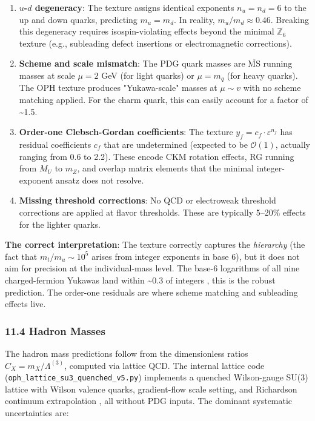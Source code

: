 \begin{enumerate}
\def\labelenumi{\arabic{enumi}.}
\item
  \textbf{\(u\)-\(d\) degeneracy}: The texture assigns identical exponents \(n_u = n_d = 6\) to the up and down quarks, predicting \(m_u = m_d\). In reality, \(m_u/m_d \approx 0.46\). Breaking this degeneracy requires isospin-violating effects beyond the minimal \(\mathbb{Z}_6\) texture (e.g., subleading defect insertions or electromagnetic corrections).
\item
  \textbf{Scheme and scale mismatch}: The PDG quark masses are \(\overline{\text{MS}}\) running masses at scale \(\mu = 2\) GeV (for light quarks) or \(\mu = m_q\) (for heavy quarks). The OPH texture produces "Yukawa-scale" masses at \(\mu \sim v\) with no scheme matching applied. For the charm quark, this can easily account for a factor of \textasciitilde1.5.
\item
  \textbf{Order-one Clebsch-Gordan coefficients}: The texture \(y_f = c_f \cdot \varepsilon^{n_f}\) has residual coefficients \(c_f\) that are undetermined (expected to be \(\mathcal{O}(1)\), actually ranging from 0.6 to 2.2). These encode CKM rotation effects, RG running from \(M_U\) to \(m_Z\), and overlap matrix elements that the minimal integer-exponent ansatz does not resolve.
\item
  \textbf{Missing threshold corrections}: No QCD or electroweak threshold corrections are applied at flavor thresholds. These are typically 5--20\% effects for the lighter quarks.
\end{enumerate}

\textbf{The correct interpretation}: The texture correctly captures the \emph{hierarchy} (the fact that \(m_t/m_u \sim 10^5\) arises from integer exponents in base 6), but it does not aim for precision at the individual-mass level. The base-6 logarithms of all nine charged-fermion Yukawas land within \textasciitilde0.3 of integers , this is the robust prediction. The order-one residuals are where scheme matching and subleading effects live.

\subsubsection{11.4 Hadron Masses}\label{114-hadron-masses}

The hadron mass predictions follow from the dimensionless ratios \(C_X = m_X/\Lambda^{(3)}\), computed via lattice QCD. The internal lattice code (\texttt{oph\_lattice\_su3\_quenched\_v5.py}) implements a quenched Wilson-gauge SU(3) lattice with Wilson valence quarks, gradient-flow scale setting, and Richardson continuum extrapolation , all without PDG inputs. The dominant systematic uncertainties are:

